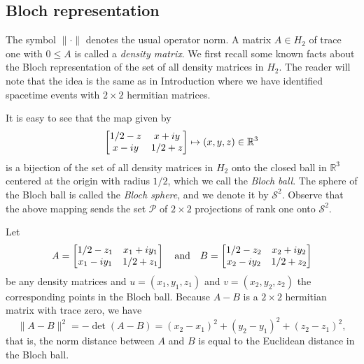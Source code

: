 \documentclass[10pt,a4paper]{amsart}
\providecommand{\index}[1]{}
\newcommand\cP{{\mathcal{P}}}
\theoremstyle{definition}
\theoremstyle{remark}
\numberwithin{subsection}{section}
\numberwithin{equation}{section}
\begin{document}
\subsection{Bloch representation}\label{projectionsx}\index{Bloch representation}
The symbol $\| \cdot \|$ \index{$\lVert \cdot \rVert$} denotes the usual operator norm.
A matrix $A\in H_2$ of trace one with $0\leq A$ is called a \emph{density matrix}\index{density matrix}.
We first recall some known facts about the Bloch representation \index{Bloch representation} of the set of all density matrices in $H_2$. 
The reader will note that the idea is the same as in Introduction where we have identified spacetime events with $2\times 2$ hermitian matrices. 

It is easy to see that the map
given by
\begin{equation}\label{blochmap}
 \left[ \begin{matrix} 1/2 - z & x+iy \cr x-iy & 1/2 +z \cr \end{matrix} \right] \mapsto (x,y,z) \in \mathbb{R}^3 
\end{equation}
is a bijection of the set of all density matrices in $H_2$ onto the closed ball in $\mathbb{R}^3$ centered at the origin with radius $1/2$, which we call the \emph{Bloch ball}\index{Bloch ball}. 
The sphere of the Bloch ball is called the \emph{Bloch sphere}\index{Bloch sphere}, and we denote it by $\mathcal{S}^2$\index{$S^2@$\mathcal{S}^2$}. 
Observe that the above mapping sends the set $\cP$ of $2\times2$ projections of rank one onto $\mathcal{S}^2$. 

Let
\[
A =  \left[ \begin{matrix} 1/2 - z_1 & x_1+iy_1 \cr x_1-iy_1 & 1/2 +z_1 \cr \end{matrix} \right] \ \ \ \text{and} \ \ \ B =  \left[ \begin{matrix} 1/2 - z_2 & x_2+iy_2 \cr x_2-iy_2 & 1/2 +z_2 \cr \end{matrix} \right]
\]
be any density matrices and $u = (x_1 , y_1 , z_1)$ and $v = (x_2, y_2, z_2)$ the corresponding points in the Bloch ball. 
Because $A-B$ is a $2\times 2$ hermitian matrix with trace zero, we have 
\begin{equation}\label{bb}
\| A - B \|^2 = - \det (A-B)= (x_2 - x_1)^2 + (y_2 - y_1)^2 + (z_2 - z_1)^2,
\end{equation}
that is, the norm distance between $A$ and $B$ is equal to the Euclidean distance in the Bloch ball. 
\end{document}
